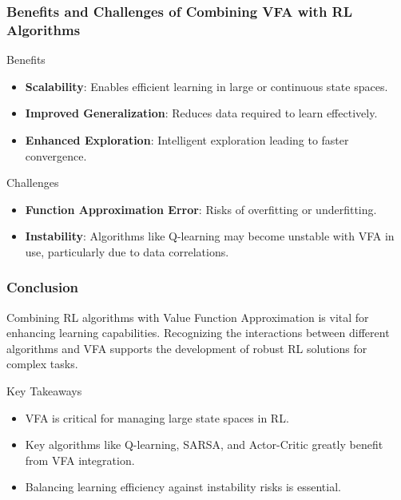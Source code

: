 \documentclass[aspectratio=169]{beamer}
\begin{document}
\begin{frame}[fragile]
    \frametitle{Benefits and Challenges of Combining VFA with RL Algorithms}
    \begin{block}{Benefits}
        \begin{itemize}
            \item \textbf{Scalability}: Enables efficient learning in large or continuous state spaces.
            \item \textbf{Improved Generalization}: Reduces data required to learn effectively.
            \item \textbf{Enhanced Exploration}: Intelligent exploration leading to faster convergence.
        \end{itemize}
    \end{block}

    \begin{block}{Challenges}
        \begin{itemize}
            \item \textbf{Function Approximation Error}: Risks of overfitting or underfitting.
            \item \textbf{Instability}: Algorithms like Q-learning may become unstable with VFA in use, particularly due to data correlations.
        \end{itemize}
    \end{block}
\end{frame}

\begin{frame}[fragile]
    \frametitle{Conclusion}
    Combining RL algorithms with Value Function Approximation is vital for enhancing learning capabilities. Recognizing the interactions between different algorithms and VFA supports the development of robust RL solutions for complex tasks.

    \begin{block}{Key Takeaways}
        \begin{itemize}
            \item VFA is critical for managing large state spaces in RL.
            \item Key algorithms like Q-learning, SARSA, and Actor-Critic greatly benefit from VFA integration.
            \item Balancing learning efficiency against instability risks is essential.
        \end{itemize}
    \end{block}
\end{frame}
\end{document}
